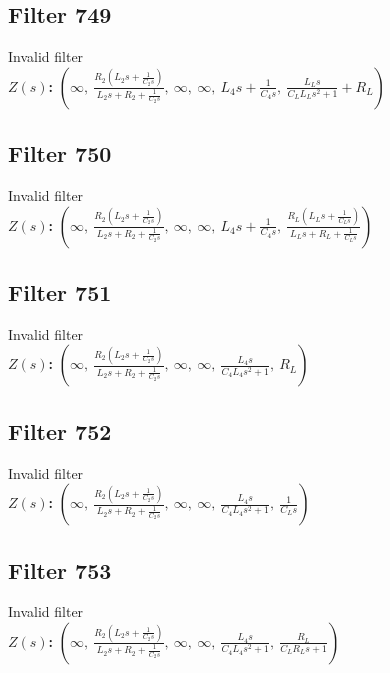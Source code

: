 \documentclass{article}
\begin{document}
\subsection*{Filter 749}
Invalid filter \\ 
\textbf{$Z(s)$:} $\left( \infty, \  \frac{R_{2} \left(L_{2} s + \frac{1}{C_{2} s}\right)}{L_{2} s + R_{2} + \frac{1}{C_{2} s}}, \  \infty, \  \infty, \  L_{4} s + \frac{1}{C_{4} s}, \  \frac{L_{L} s}{C_{L} L_{L} s^{2} + 1} + R_{L}\right)$ \\ 
\subsection*{Filter 750}
Invalid filter \\ 
\textbf{$Z(s)$:} $\left( \infty, \  \frac{R_{2} \left(L_{2} s + \frac{1}{C_{2} s}\right)}{L_{2} s + R_{2} + \frac{1}{C_{2} s}}, \  \infty, \  \infty, \  L_{4} s + \frac{1}{C_{4} s}, \  \frac{R_{L} \left(L_{L} s + \frac{1}{C_{L} s}\right)}{L_{L} s + R_{L} + \frac{1}{C_{L} s}}\right)$ \\ 
\subsection*{Filter 751}
Invalid filter \\ 
\textbf{$Z(s)$:} $\left( \infty, \  \frac{R_{2} \left(L_{2} s + \frac{1}{C_{2} s}\right)}{L_{2} s + R_{2} + \frac{1}{C_{2} s}}, \  \infty, \  \infty, \  \frac{L_{4} s}{C_{4} L_{4} s^{2} + 1}, \  R_{L}\right)$ \\ 
\subsection*{Filter 752}
Invalid filter \\ 
\textbf{$Z(s)$:} $\left( \infty, \  \frac{R_{2} \left(L_{2} s + \frac{1}{C_{2} s}\right)}{L_{2} s + R_{2} + \frac{1}{C_{2} s}}, \  \infty, \  \infty, \  \frac{L_{4} s}{C_{4} L_{4} s^{2} + 1}, \  \frac{1}{C_{L} s}\right)$ \\ 
\subsection*{Filter 753}
Invalid filter \\ 
\textbf{$Z(s)$:} $\left( \infty, \  \frac{R_{2} \left(L_{2} s + \frac{1}{C_{2} s}\right)}{L_{2} s + R_{2} + \frac{1}{C_{2} s}}, \  \infty, \  \infty, \  \frac{L_{4} s}{C_{4} L_{4} s^{2} + 1}, \  \frac{R_{L}}{C_{L} R_{L} s + 1}\right)$ \\ 
\end{document}
